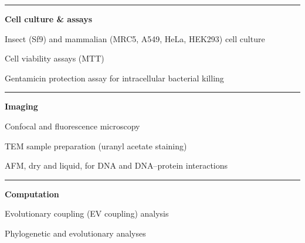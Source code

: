 \documentclass[11pt]{article}
\newif\ifskillfirst
\newcommand{\skillsep}{\ \textcolor{inkfaint}{$\cdot$}\ }
\newenvironment{skillgroup}[1]{%
  \needspace{3\baselineskip}%
  \par\noindent
  \begingroup
  \setlength{\parskip}{0pt}%
  {\color{accent}\rule[0.06em]{0.42em}{0.42em}}\hspace{0.45em}%
  \textbf{\small #1}\par
  \vspace{0.2em}
  \small
  \skillfirsttrue
}{%
  \par\endgroup
  \vspace{0.75em}
}
\newcommand{\skill}[1]{%
  \ifskillfirst\skillfirstfalse\else\skillsep\fi
  #1%
}
\begin{document}
\begin{skillgroup}{Cell culture \& assays}
  \skill{Insect (Sf9) and mammalian (MRC5, A549,
         HeLa, HEK293) cell culture}
  \skill{Cell viability assays (MTT)}
  \skill{Gentamicin protection assay for
         intracellular bacterial killing}
\end{skillgroup}

\begin{skillgroup}{Imaging}
  \skill{Confocal and fluorescence microscopy}
  \skill{TEM sample preparation
         (uranyl acetate staining)}
  \skill{AFM, dry and liquid, for DNA and
         DNA--protein interactions}
\end{skillgroup}

\begin{skillgroup}{Computation}
  \skill{Evolutionary coupling (EV coupling) analysis}
  \skill{Phylogenetic and evolutionary analyses}
\end{skillgroup}
\end{document}
